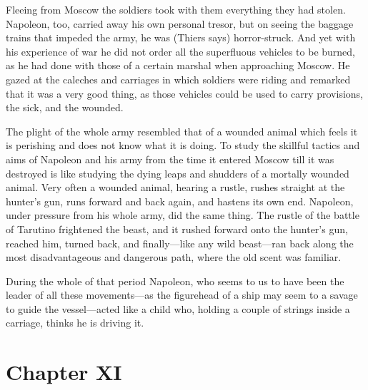 Fleeing from Moscow the soldiers took with them everything they
had stolen. Napoleon, too, carried away his own personal tresor,
but on seeing the baggage trains that impeded the army, he was
(Thiers says) horror-struck. And yet with his experience of war
he did not order all the superfluous vehicles to be burned, as he
had done with those of a certain marshal when approaching
Moscow. He gazed at the caleches and carriages in which soldiers
were riding and remarked that it was a very good thing, as those
vehicles could be used to carry provisions, the sick, and the
wounded.

The plight of the whole army resembled that of a wounded animal
which feels it is perishing and does not know what it is
doing. To study the skillful tactics and aims of Napoleon and his
army from the time it entered Moscow till it was destroyed is
like studying the dying leaps and shudders of a mortally wounded
animal. Very often a wounded animal, hearing a rustle, rushes
straight at the hunter's gun, runs forward and back again, and
hastens its own end. Napoleon, under pressure from his whole
army, did the same thing. The rustle of the battle of Tarutino
frightened the beast, and it rushed forward onto the hunter's
gun, reached him, turned back, and finally---like any wild
beast---ran back along the most disadvantageous and dangerous
path, where the old scent was familiar.

During the whole of that period Napoleon, who seems to us to have
been the leader of all these movements---as the figurehead of a
ship may seem to a savage to guide the vessel---acted like a
child who, holding a couple of strings inside a carriage, thinks
he is driving it.


\chapter*{Chapter XI} \ifaudio {}
\fi 


